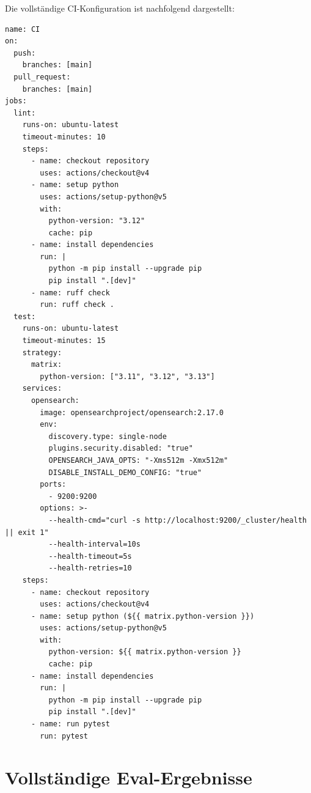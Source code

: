 Die vollständige CI-Konfiguration ist nachfolgend dargestellt:

\begin{lstlisting}[caption={CI-Konfiguration des Projekts},captionpos=t,basicstyle=\ttfamily\footnotesize]
name: CI
on:
  push:
    branches: [main]
  pull_request:
    branches: [main]
jobs:
  lint:
    runs-on: ubuntu-latest
    timeout-minutes: 10
    steps:
      - name: checkout repository
        uses: actions/checkout@v4
      - name: setup python
        uses: actions/setup-python@v5
        with:
          python-version: "3.12"
          cache: pip
      - name: install dependencies
        run: |
          python -m pip install --upgrade pip
          pip install ".[dev]"
      - name: ruff check
        run: ruff check .
  test:
    runs-on: ubuntu-latest
    timeout-minutes: 15
    strategy:
      matrix:
        python-version: ["3.11", "3.12", "3.13"]
    services:
      opensearch:
        image: opensearchproject/opensearch:2.17.0
        env:
          discovery.type: single-node
          plugins.security.disabled: "true"
          OPENSEARCH_JAVA_OPTS: "-Xms512m -Xmx512m"
          DISABLE_INSTALL_DEMO_CONFIG: "true"
        ports:
          - 9200:9200
        options: >-
          --health-cmd="curl -s http://localhost:9200/_cluster/health || exit 1"
          --health-interval=10s
          --health-timeout=5s
          --health-retries=10
    steps:
      - name: checkout repository
        uses: actions/checkout@v4
      - name: setup python (${{ matrix.python-version }})
        uses: actions/setup-python@v5
        with:
          python-version: ${{ matrix.python-version }}
          cache: pip
      - name: install dependencies
        run: |
          python -m pip install --upgrade pip
          pip install ".[dev]"
      - name: run pytest
        run: pytest
\end{lstlisting}

\section{Vollständige Eval-Ergebnisse}

